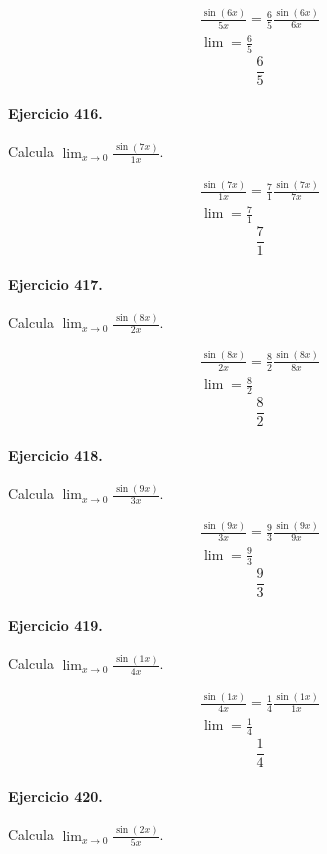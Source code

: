 \documentclass[11pt,a4paper]{article}
\begin{document}
\[
\begin{aligned}
\frac{\sin(6x)}{5x}=\frac{6}{5}\frac{\sin(6x)}{6x}\\
\lim=\frac{6}{5}
\end{aligned}
\]
\[\boxed{\frac{6}{5}}\]


\paragraph{Ejercicio 416.} Calcula $\displaystyle\lim_{x\to0}\frac{\sin(7x)}{1x}$.

\[
\begin{aligned}
\frac{\sin(7x)}{1x}=\frac{7}{1}\frac{\sin(7x)}{7x}\\
\lim=\frac{7}{1}
\end{aligned}
\]
\[\boxed{\frac{7}{1}}\]


\paragraph{Ejercicio 417.} Calcula $\displaystyle\lim_{x\to0}\frac{\sin(8x)}{2x}$.

\[
\begin{aligned}
\frac{\sin(8x)}{2x}=\frac{8}{2}\frac{\sin(8x)}{8x}\\
\lim=\frac{8}{2}
\end{aligned}
\]
\[\boxed{\frac{8}{2}}\]


\paragraph{Ejercicio 418.} Calcula $\displaystyle\lim_{x\to0}\frac{\sin(9x)}{3x}$.

\[
\begin{aligned}
\frac{\sin(9x)}{3x}=\frac{9}{3}\frac{\sin(9x)}{9x}\\
\lim=\frac{9}{3}
\end{aligned}
\]
\[\boxed{\frac{9}{3}}\]


\paragraph{Ejercicio 419.} Calcula $\displaystyle\lim_{x\to0}\frac{\sin(1x)}{4x}$.

\[
\begin{aligned}
\frac{\sin(1x)}{4x}=\frac{1}{4}\frac{\sin(1x)}{1x}\\
\lim=\frac{1}{4}
\end{aligned}
\]
\[\boxed{\frac{1}{4}}\]


\paragraph{Ejercicio 420.} Calcula $\displaystyle\lim_{x\to0}\frac{\sin(2x)}{5x}$.
\end{document}

